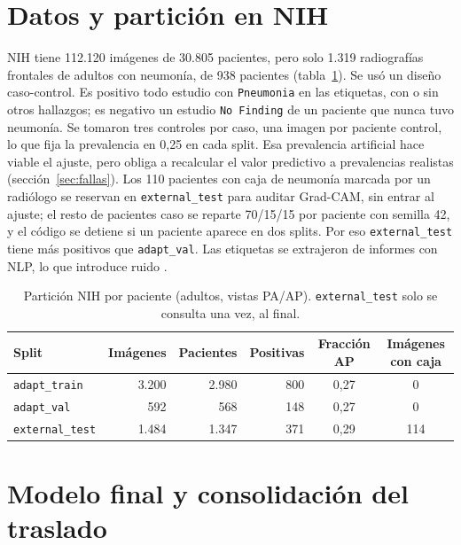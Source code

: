 \documentclass[11pt]{article}
\begin{document}
\section{Datos y partición en NIH}
NIH tiene 112.120 imágenes de 30.805 pacientes, pero solo 1.319 radiografías frontales de adultos con neumonía, de 938 pacientes (tabla~\ref{tab:datos}). Se usó un diseño caso-control. Es positivo todo estudio con \texttt{Pneumonia} en las etiquetas, con o sin otros hallazgos; es negativo un estudio \texttt{No Finding} de un paciente que nunca tuvo neumonía. Se tomaron tres controles por caso, una imagen por paciente control, lo que fija la prevalencia en 0,25 en cada split. Esa prevalencia artificial hace viable el ajuste, pero obliga a recalcular el valor predictivo a prevalencias realistas (sección~\ref{sec:fallas}). Los 110 pacientes con caja de neumonía marcada por un radiólogo se reservan en \texttt{external\_test} para auditar Grad-CAM, sin entrar al ajuste; el resto de pacientes caso se reparte 70/15/15 por paciente con semilla 42, y el código se detiene si un paciente aparece en dos splits. Por eso \texttt{external\_test} tiene más positivos que \texttt{adapt\_val}. Las etiquetas se extrajeron de informes con NLP, lo que introduce ruido \parencite{oakdenrayner2020}.

\begin{table}[h]\centering\small
\caption{Partición NIH por paciente (adultos, vistas PA/AP). \texttt{external\_test} solo se consulta una vez, al final.}\label{tab:datos}
\begin{tabular}{lrrrcc}\toprule
Split & Imágenes & Pacientes & Positivas & Fracción AP & Imágenes con caja \\\midrule
\texttt{adapt\_train} & 3.200 & 2.980 & 800 & 0,27 & 0 \\
\texttt{adapt\_val} & 592 & 568 & 148 & 0,27 & 0 \\
\texttt{external\_test} & 1.484 & 1.347 & 371 & 0,29 & 114 \\\bottomrule
\end{tabular}
\end{table}

\section{Modelo final y consolidación del traslado}
\end{document}
